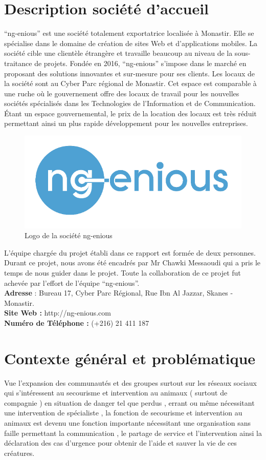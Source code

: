 \documentclass[11pt,a4paper,oneside]{book}
\begin{document}
	\section{Description société d’accueil}
	“ng-enious” est une société totalement exportatrice localisée à Monastir. Elle se spécialise dans le domaine de création de sites Web et d’applications mobiles. La société cible une clientèle étrangère et travaille beaucoup au niveau de la sous-traitance de projets. Fondée en 2016, “ng-enious” s’impose dans le marché en proposant des solutions innovantes et sur-mesure pour ses clients.
	Les locaux de la société sont au Cyber Parc régional de Monastir. Cet espace est comparable à une ruche où le gouvernement offre des locaux de travail pour les nouvelles sociétés spécialisés dans les Technologies de l’Information et de Communication. Étant un espace gouvernemental, le prix de la location des locaux est très réduit permettant ainsi un plus rapide développement pour les nouvelles entreprises.\\
	\begin{figure}[H]
		\centering
		\includegraphics[width=0.7\linewidth]{Images/Ch1/logo-ng-enious}
		\caption{Logo de la société ng-enious}
		\label{fig:logo-ng-enious}
	\end{figure}
	
	
	L’équipe chargée du projet établi dans ce rapport est formée de deux personnes. Durant ce projet, nous avons été encadrés par Mr Chawki Messaoudi qui a pris le temps de nous guider dans le projet. Toute la collaboration de ce projet fut achevée par l'effort de l’équipe “ng-enious”.\\
	\textbf{Adresse} : Bureau 17, Cyber Parc Régional, Rue Ibn Al Jazzar, Skanes - Monastir.\\
	\textbf{Site Web :} http://ng-enious.com\\
	\textbf{Numéro de Téléphone :} (+216) 21 411 187	
	\section{Contexte général et problématique}
	Vue l’expansion des communautés et des groupes surtout sur les réseaux sociaux qui s’intéressent au secourisme et intervention au animaux ( surtout de compagnie ) en situation de danger tel que perdus , errant ou même nécessitant une intervention de spécialiste , la fonction de secourisme et intervention au animaux est devenu une fonction importante nécessitant une organisation sans faille permettant la communication , le partage de service et l’intervention ainsi la déclaration des cas d’urgence pour obtenir de l’aide et sauver la vie de ces créatures.
	
\end{document}
